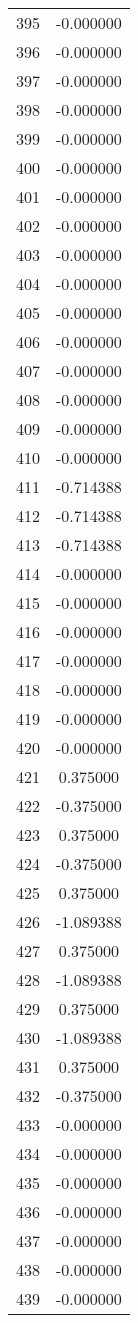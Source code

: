\documentclass[12pt]{article}
\begin{document}
\begin{longtable}{@{}cc@{}}
395 & -0.000000 \\
396 & -0.000000 \\
397 & -0.000000 \\
398 & -0.000000 \\
399 & -0.000000 \\
400 & -0.000000 \\
401 & -0.000000 \\
402 & -0.000000 \\
403 & -0.000000 \\
404 & -0.000000 \\
405 & -0.000000 \\
406 & -0.000000 \\
407 & -0.000000 \\
408 & -0.000000 \\
409 & -0.000000 \\
410 & -0.000000 \\
411 & -0.714388 \\
412 & -0.714388 \\
413 & -0.714388 \\
414 & -0.000000 \\
415 & -0.000000 \\
416 & -0.000000 \\
417 & -0.000000 \\
418 & -0.000000 \\
419 & -0.000000 \\
420 & -0.000000 \\
421 & 0.375000 \\
422 & -0.375000 \\
423 & 0.375000 \\
424 & -0.375000 \\
425 & 0.375000 \\
426 & -1.089388 \\
427 & 0.375000 \\
428 & -1.089388 \\
429 & 0.375000 \\
430 & -1.089388 \\
431 & 0.375000 \\
432 & -0.375000 \\
433 & -0.000000 \\
434 & -0.000000 \\
435 & -0.000000 \\
436 & -0.000000 \\
437 & -0.000000 \\
438 & -0.000000 \\
439 & -0.000000 \\

\end{longtable}
\end{document}
